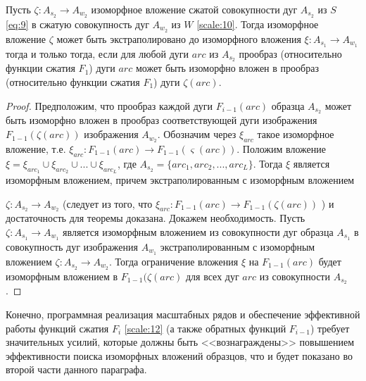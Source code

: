 \begin{theorem}
Пусть  $\zeta: A_{s_2} \to A_{w_2}$  изоморфное вложение сжатой совокупности дуг $A_{s_2}$ из $S$ \ref{eq:9} в  сжатую  совокупность дуг $A_{w_2}$ из  $W$ \ref{scale:10}. Тогда  изоморфное вложение  $\zeta$  может быть экстраполировано  до  изоморфного вложения  $\xi: A_{s_1} \to A_{w_1}$ тогда и только тогда, если   для любой дуги $arc$ из $A_{s_2}$ прообраз  (относительно  функции сжатия  $F_1$)  дуги  $arc$ может быть изоморфно вложен в прообраз  (относительно  функции сжатия  $F_1$)   дуги $\zeta(arc)$.                 
\label{scale:theoremA}
\end{theorem}            
\begin{proof}
Предположим, что  прообраз каждой дуги $F_{i-1}(arc)$ образца $A_{s_2}$  может быть изоморфно вложен в прообраз соответствующей дуги изображения  $F_{1-1}(\zeta (arc))$  изображения  $A_{w_2}$.  Обозначим через  $\xi_{arc}$ такое изоморфное вложение, т.е.  $\xi_{arc} : F_{1 -1}(arc) \to F_{1 -1}(\varsigma (arc))$.  
Положим вложение $\xi = \xi_{arc_1} \cup \xi_{arc_2} \cup ... \cup \xi_{arc_L}$, где $A_{s_2} = \{arc_1, arc_2, ..., arc_L\}$. Тогда $\xi$ является изоморфным вложением, причем  экстраполированным  с изоморфным вложением  

$\zeta : A_{s_2} \to A_{w_2}$ (следует из того, что $\xi_{arc} : F_{1 -1}(arc) \to F_{1 -1}(\zeta (arc))$ ) и достаточность для теоремы  доказана.    
Докажем необходимость. Пусть $\zeta : A_{s_1} \to A_{w_1}$ является изоморфным вложением из совокупности дуг образца  $A_{s_1}$  в совокупность дуг  изображения  $A_{w_1}$ экстраполированным  с изоморфным вложением  $\zeta : A_{s_2} \to A_{w_2}$.  Тогда ограничение вложения  $\xi$  на  $F_{1 -1}(arc)$  будет изоморфным вложением в $F_{1 -1}(\zeta (arc)$  для всех дуг  $arc$  из  совокупности  $A_{s_2}$. 
\end{proof}          

\begin{remark}
Конечно, программная реализация масштабных рядов и обеспечение эффективной работы функций сжатия $F_i$ \ref{scale:12}  (а также обратных функций $F_{i -1}$)  требует  значительных усилий, которые должны быть <<вознаграждены>> повышением эффективности поиска изоморфных вложений образцов, что и будет показано во второй части данного параграфа.
\end{remark}

